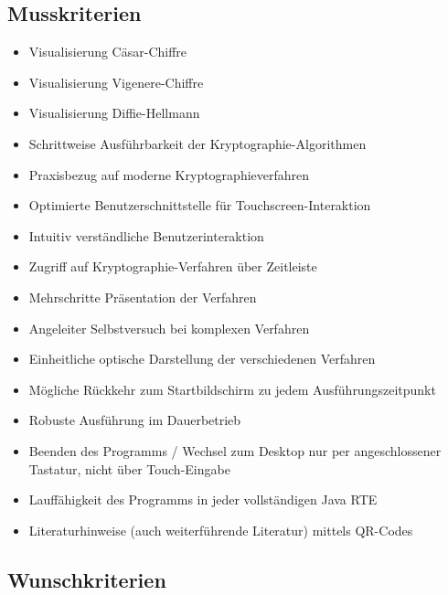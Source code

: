 \documentclass{article}
\begin{document}
\subsection{Musskriterien}

\begin{itemize}
    \item Visualisierung Cäsar-Chiffre
    \item Visualisierung Vigenere-Chiffre
    \item Visualisierung Diffie-Hellmann
    \item Schrittweise Ausführbarkeit der Kryptographie-Algorithmen
    \item Praxisbezug auf moderne Kryptographieverfahren
    \item Optimierte \gls{Benutzerschnittstelle} für Touchscreen-Interaktion
    \item Intuitiv verständliche Benutzerinteraktion
    \item Zugriff auf Kryptographie-Verfahren über Zeitleiste
    \item Mehrschritte Präsentation der Verfahren
    \item Angeleiter Selbstversuch bei komplexen Verfahren
    \item Einheitliche optische Darstellung der verschiedenen Verfahren
    \item Mögliche Rückkehr zum Startbildschirm zu jedem Ausführungszeitpunkt
    \item Robuste Ausführung im Dauerbetrieb
    \item Beenden des Programms / Wechsel zum Desktop nur per angeschlossener Tastatur, nicht über Touch-Eingabe
    \item Lauffähigkeit des Programms in jeder vollständigen Java RTE
    \item Literaturhinweise (auch weiterführende Literatur) mittels QR-Codes
\end{itemize}

\subsection{Wunschkriterien}
\end{document}
